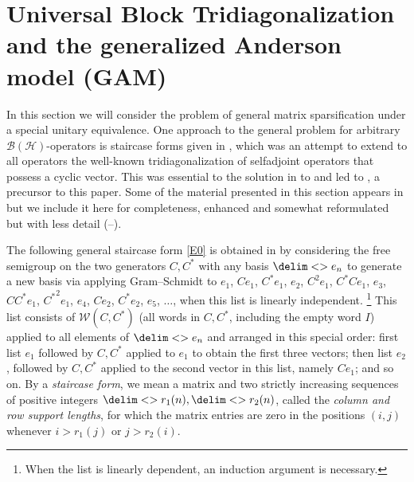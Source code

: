 \documentclass[10pt,reqno]{amsart}
\theoremstyle{remark}
\newcommand{\BH}{\mathcal{B}(\Hil)}
\newcommand{\Hil}{\mathcal{H}}
\newcommand{\seq}{\delim<>}
\newcommand{\term}[1]{\emph{#1}}
\numberwithin{equation}{section}
\begin{document}
\section{Universal Block Tridiagonalization and the generalized Anderson model (GAM)}
\label{sec2}

In this section we will consider the problem of general matrix sparsification under a special unitary equivalence.
One approach to the general problem for arbitrary $\BH$-operators is staircase forms given in \cite{Wei-1980-IEOT}, which was an attempt to extend to all operators the well-known tridiagonalization of selfadjoint operators that possess a cyclic vector.
This was essential to the solution in \cite{Wei-1980-IEOT} to \cite[Problems 3 and 3$'$]{PT-1971-MMJ} and led to \cite{PPW-2020-TmloVLOt}, a precursor to this paper.
Some of the material presented in this section appears in \cite{PPW-2020-TmloVLOt} but we include it here for completeness, enhanced and somewhat reformulated but with less detail (--).



The following general staircase form \eqref{E0} is obtained in \cite{Wei-1980-IEOT} by considering the free semigroup on the two generators $C,C^*$ with any basis $\seq{e_n}$ to generate a new basis via applying Gram--Schmidt to $e_1$, $Ce_1$, $C^*e_1$, $e_2$, $C^2e_1$, $C^*Ce_1$, $e_3$, $CC^*e_1$, ${C^*}^2e_1$, $e_4$, $Ce_2$, $C^*e_2$, $e_5$, $\dots$, when this list is linearly independent.%
\footnote{%
  When the list is linearly dependent, an induction argument is necessary.
}
This list consists of $\mathcal{W}(C,C^*)$ (all words in $C,C^*$, including the empty word $I$) applied to all elements of $\seq{e_n}$ and arranged in this special order:
first list $e_1$ followed by $C,C^*$ applied to $e_1$ to obtain the first three vectors;
then list $e_2$, followed by $C,C^*$ applied to the second vector in this list, namely $Ce_1$;
and so on.
By a \term{staircase form}, we mean a matrix and two strictly increasing sequences of positive integers $\seq{r_1(n)},\seq{r_2(n)}$, called the \term{column and row support lengths}, for which the matrix entries are zero in the positions $(i,j)$ whenever $i > r_1(j)$ or $j > r_2(i)$.
\end{document}

